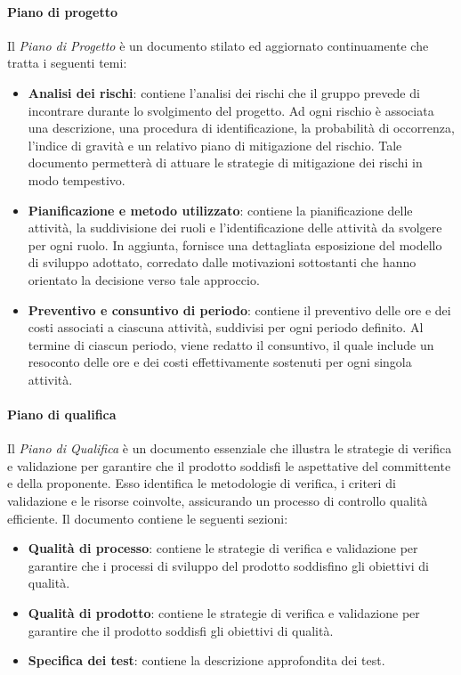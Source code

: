 \paragraph{Piano di progetto}
Il \textit{Piano di Progetto} è un documento stilato ed aggiornato continuamente che tratta i seguenti temi:
\begin{itemize}
    \item \textbf{Analisi dei rischi}: contiene l'analisi dei rischi che il gruppo prevede di incontrare durante lo svolgimento del progetto. Ad ogni rischio è associata una descrizione, una procedura di identificazione, la probabilità di occorrenza, l'indice di gravità e un relativo piano di mitigazione del rischio. Tale documento permetterà di attuare le strategie di mitigazione dei rischi in modo tempestivo.
    \item \textbf{Pianificazione e metodo utilizzato}: contiene la pianificazione delle attività, la suddivisione dei ruoli e l'identificazione delle attività da svolgere per ogni ruolo. In aggiunta, fornisce una dettagliata esposizione del modello di sviluppo adottato, corredato dalle motivazioni sottostanti che hanno orientato la decisione verso tale approccio.
    \item \textbf{Preventivo e consuntivo di periodo}: contiene il preventivo  delle ore e dei costi associati a ciascuna attività, suddivisi per ogni periodo definito. Al termine di ciascun periodo, viene redatto il consuntivo, il quale include un resoconto delle ore e dei costi effettivamente sostenuti per ogni singola attività.
\end{itemize}

\paragraph{Piano di qualifica}
Il \textit{Piano di Qualifica} è un documento essenziale che illustra le strategie di verifica e validazione per garantire che il prodotto soddisfi le aspettative del committente e della proponente. Esso identifica le metodologie di verifica, i criteri di validazione e le risorse coinvolte, assicurando un processo di controllo qualità efficiente.
Il documento contiene le seguenti sezioni:
\begin{itemize}
    \item \textbf{Qualità di processo}: contiene le strategie di verifica e validazione per garantire che i processi di sviluppo del prodotto soddisfino gli obiettivi di qualità.
    \item \textbf{Qualità di prodotto}: contiene le strategie di verifica e validazione per garantire che il prodotto soddisfi gli obiettivi di qualità.
    \item \textbf{Specifica dei test}: contiene la descrizione approfondita dei test. 
\end{itemize}

